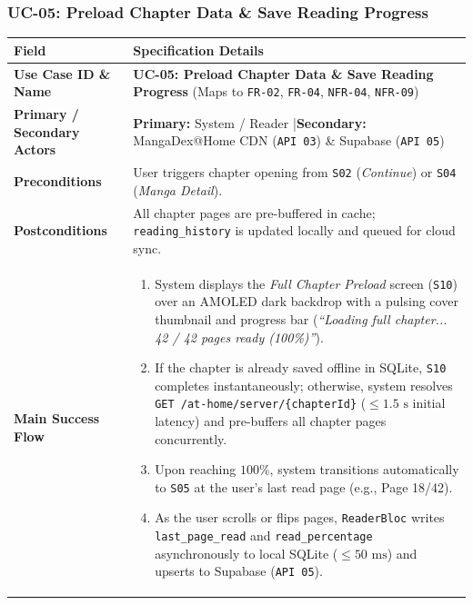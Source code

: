 \subsubsection{UC-05: Preload Chapter Data \& Save Reading Progress}
\begin{table}[H]
\footnotesize
\renewcommand{\arraystretch}{1.22}
\begin{tabularx}{\textwidth}{L{3.2cm} Y}
\toprule
{}
\textbf{Field} & \textbf{Specification Details} \\
\midrule
\textbf{Use Case ID \& Name} & \textbf{UC-05: Preload Chapter Data \& Save Reading Progress} (Maps to \texttt{FR-02}, \texttt{FR-04}, \texttt{NFR-04}, \texttt{NFR-09}) \\
\textbf{Primary / Secondary Actors} & \textbf{Primary:} System / Reader \quad|\quad \textbf{Secondary:} MangaDex@Home CDN (\texttt{API 03}) \& Supabase (\texttt{API 05}) \\
\textbf{Preconditions} & User triggers chapter opening from \texttt{S02} (\textit{Continue}) or \texttt{S04} (\textit{Manga Detail}). \\
\textbf{Postconditions} & All chapter pages are pre-buffered in cache; \texttt{reading\_history} is updated locally and queued for cloud sync. \\
\textbf{Main Success Flow} &
\begin{enumerate}[nosep,leftmargin=1.4em]
    \item System displays the \textit{Full Chapter Preload} screen (\texttt{S10}) over an AMOLED dark backdrop with a pulsing cover thumbnail and progress bar (\textit{``Loading full chapter... 42 / 42 pages ready (100\%)''}).
    \item If the chapter is already saved offline in SQLite, \texttt{S10} completes instantaneously; otherwise, system resolves \texttt{GET /at-home/server/\{chapterId\}} ($\le 1.5\text{ s}$ initial latency) and pre-buffers all chapter pages concurrently.
    \item Upon reaching $100\%$, system transitions automatically to \texttt{S05} at the user's last read page (e.g., Page 18/42).
    \item As the user scrolls or flips pages, \texttt{ReaderBloc} writes \texttt{last\_page\_read} and \texttt{read\_percentage} asynchronously to local SQLite ($\le 50\text{ ms}$) and upserts to Supabase (\texttt{API 05}).
\end{enumerate} \\
\bottomrule
\end{tabularx}
\end{table}


